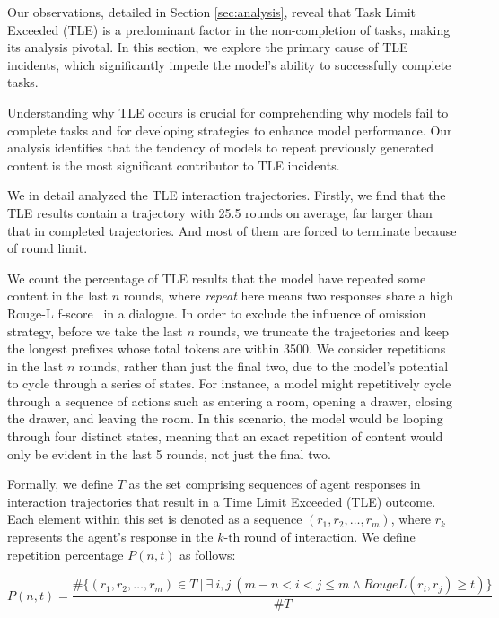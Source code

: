 Our observations, detailed in Section \ref{sec:analysis}, reveal that Task Limit Exceeded (TLE) is a predominant factor in the non-completion of tasks, making its analysis pivotal. In this section, we explore the primary cause of TLE incidents, which significantly impede the model's ability to successfully complete tasks. 

Understanding why TLE occurs is crucial for comprehending why models fail to complete tasks and for developing strategies to enhance model performance. Our analysis identifies that the tendency of models to repeat previously generated content is the most significant contributor to TLE incidents.

We in detail analyzed the TLE interaction trajectories. Firstly, we find that the TLE results contain a trajectory with 25.5 rounds on average, far larger than that in completed trajectories. And most of them are forced to terminate because of round limit.

We count the percentage of TLE results that the model have repeated some content in the last $n$ rounds, where \textit{repeat} here means two responses share a high Rouge-L f-score~\citep{lin-2004-rouge} in a dialogue. In order to exclude the influence of omission strategy, before we take the last $n$ rounds, we truncate the trajectories and keep the longest prefixes whose total tokens are within 3500. We consider repetitions in the last $n$ rounds, rather than just the final two, due to the model's potential to cycle through a series of states. For instance, a model might repetitively cycle through a sequence of actions such as entering a room, opening a drawer, closing the drawer, and leaving the room. In this scenario, the model would be looping through four distinct states, meaning that an exact repetition of content would only be evident in the last 5 rounds, not just the final two.

Formally, we define $ T $ as the set comprising sequences of agent responses in interaction trajectories that result in a Time Limit Exceeded (TLE) outcome. Each element within this set is denoted as a sequence $ (r_1, r_2, \ldots, r_m) $, where $ r_k $ represents the agent's response in the $ k $-th round of interaction. We define repetition percentage $P(n, t)$ as follows:

\begin{equation}
    P(n, t) = \frac{\# \{(r_1, r_2, \ldots, r_m)\in T \ | \ \exists \ i,j \  (m - n < i < j \le m \land RougeL(r_i, r_j) \ge t) \}}{\# T}
\end{equation}

